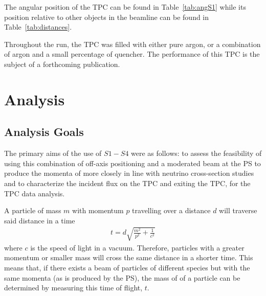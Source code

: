 The angular position of the TPC can be found in Table~\ref{tab:angS1} while its position relative to other objects in the beamline can be found in Table~\ref{tab:distances}.

Throughout the run, the TPC was filled with either pure argon, or a combination of argon and a small percentage of quencher. 
The performance of this TPC is the subject of a forthcoming publication.

\section{Analysis}
\label{hptpcPaper:sec:Analysis}
\subsection{Analysis Goals}

The primary aims of the use of $\mathit{S1} - \mathit{S4}$ were as follows: to assess the feasibility of using this combination of off-axis positioning and a moderated beam at the PS to produce the momenta of more closely in line with neutrino cross-section studies and to characterize the incident flux on the TPC and exiting the TPC, for the TPC data analysis.


A particle of mass $m$ with momentum $p$ travelling over a distance $d$ will traverse said distance in a time
\begin{align}
	t = d \sqrt{\frac{m^2}{p^2} + \frac{1}{c^2}}
\end{align}
where $c$ is the speed of light in a vacuum.
Therefore, particles with a greater momentum or smaller mass will cross the same distance in a shorter time.
This means that, if there exists a beam of particles of different species but with the same momenta (as is produced by the PS), the mass of of a particle can be determined by measuring this time of flight, $t$.


